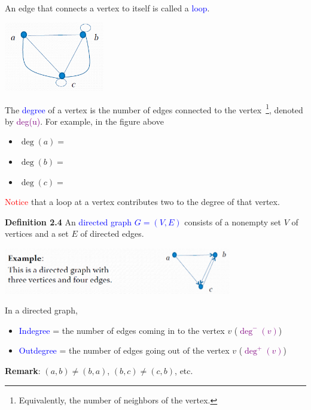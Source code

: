 \documentclass[aspectratio=169]{beamer}
\providecommand{\Blue}[1]{\textcolor{blue}{#1}}
\providecommand{\Red}[1]{\textcolor{red}{#1}}
\providecommand{\Purple}[1]{\textcolor{purple}{#1}} %
\begin{document}
\begin{frame}[plain]{}
 
   An edge that connects a vertex to itself is called a \Blue{loop}.
      \begin{center}
      \includegraphics[height=3cm]{./img/lecture2-fig2.png}
    \end{center}
    
   The \Blue{degree} of a vertex is the number of edges connected to the vertex~\footnote{Equivalently, the number of neighbors of the vertex.}, 
   denoted by \Purple{deg(u)}.
   For example,
     in the figure above
     \begin{itemize}
       \item $\deg (a) =$ 
       \item $\deg (b) =$
       \item $\deg (c) = $
     \end{itemize}  \pause
     
   \Red{Notice} that a loop at a
vertex contributes two to the degree of that vertex.
 
\end{frame}

\begin{frame}[plain]{}
 
  {\bf Definition 2.4} An \Blue{directed graph}  
      \Blue{$G = (V, E)$} consists of a nonempty set $V$ of vertices 
      and a set $E$ of directed edges. %
        \begin{center}
      \includegraphics[height=2cm]{./img/lecture2-fig3.png}
    \end{center}
     
 In a directed graph, 
      \begin{itemize}
        \item \Blue{Indegree} = the number of edges coming in to the vertex $v$ 
         (\Purple{$\deg^-(v)$})
        \item \Blue{Outdegree} = the number of edges going out of the vertex $v$ 
         (\Purple{$\deg^+(v)$})
      \end{itemize}
      
      \medskip
      
     \medskip

{\bf Remark}: $(a,b) \neq (b,a)$, $(b,c) \neq (c,b)$, etc.

\end{frame}
\end{document}
